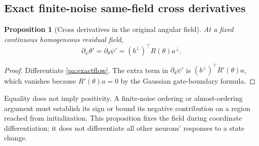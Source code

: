 \documentclass[11pt]{article}
\numberwithin{equation}{section}
\newtheorem{proposition}{Proposition}[section]
\theoremstyle{definition}
\theoremstyle{remark}
\newcommand{\1}{\mathbf 1}
\begin{document}
\subsection{Exact finite-noise same-field cross derivatives}
\begin{proposition}[Cross derivatives in the original angular field]
\label{pa:finiteqorder}
At a fixed continuous homogeneous residual field,
\[
 \partial_\psi\theta'=\partial_\theta\psi'
 =(b^\perp)^\top R(\theta)a^\perp.
\]
\end{proposition}
\begin{proof}
Differentiate \eqref{pa:exactflow}. The extra term in
$\partial_\theta\psi'$ is $(b^\perp)^\top R'(\theta)a$, which vanishes
because $R'(\theta)a=0$ by the Gaussian gate-boundary formula.
\end{proof}
Equality does not imply positivity. A finite-noise ordering or almost-ordering
argument must establish its sign or bound its negative contribution on a
region reached from initialization. This proposition fixes the field during
coordinate differentiation; it does not differentiate all other neurons'
responses to a state change.
\end{document}
